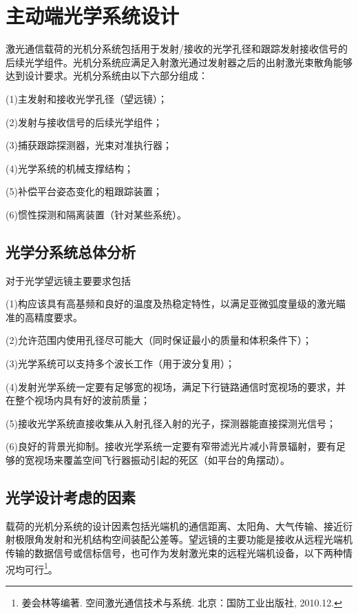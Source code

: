 \chapter{主动端光学系统设计}\label{chap:Lens Design}
激光通信载荷的光机分系统包括用于发射/接收的光学孔径和跟踪发射接收信号的后续光学组件。光机分系统应满足入射激光通过发射器之后的出射激光束散角能够达到设计要求。光机分系统由以下六部分组成：

(1)主发射和接收光学孔径（望远镜）；

(2)发射与接收信号的后续光学组件；

(3)捕获跟踪探测器，光束对准执行器；

(4)光学系统的机械支撑结构；

(5)补偿平台姿态变化的粗跟踪装置；

(6)惯性探测和隔离装置（针对某些系统）。


\section{光学分系统总体分析}
对于光学望远镜主要要求包括

(1)构应该具有高基频和良好的温度及热稳定特性，以满足亚微弧度量级的激光瞄准的高精度要求。

(2)允许范围内使用孔径尽可能大（同时保证最小的质量和体积条件下）；

(3)光学系统可以支持多个波长工作（用于波分复用）；

(4)发射光学系统一定要有足够宽的视场，满足下行链路通信时宽视场的要求，并在整个视场内具有好的波前质量；

(5)接收光学系统直接收集从入射孔径入射的光子，探测器能直接探测光信号；

(6)良好的背景光抑制。接收光学系统一定要有窄带滤光片减小背景辐射，要有足够的宽视场来覆盖空间飞行器振动引起的死区（如平台的角摆动）。
%

\section{光学设计考虑的因素}
载荷的光机分系统的设计因素包括光端机的通信距离、太阳角、大气传输、接近衍射极限角发射和光机结构空间装配公差等。望远镜的主要功能是接收从远程光端机传输的数据信号或信标信号，也可作为发射激光束的远程光端机设备，以下两种情况均可行\citep{JHL.2010.12}\footnote{姜会林等编著. 空间激光通信技术与系统. 北京：国防工业出版社, 2010.12.}。

